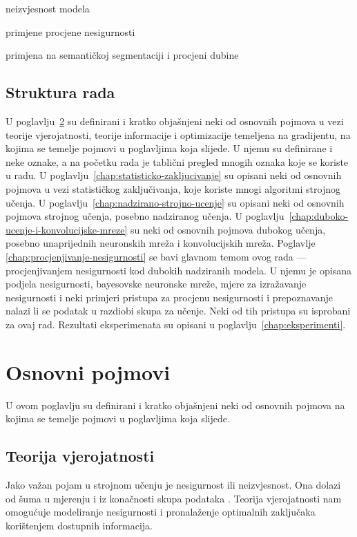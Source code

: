 \documentclass[utf8, diplomski, lmodern]{fer}
\begin{document}
neizvjesnost modela

primjene procjene nesigurnosti

primjena na semantičkoj segmentaciji i procjeni dubine


\section{Struktura rada}

U poglavlju~\ref{chap:osnovni-pojmovi} su definirani i kratko objašnjeni neki od osnovnih pojmova u vezi teorije vjerojatnosti, teorije informacije i optimizacije temeljena na gradijentu, na kojima se temelje pojmovi u poglavljima koja slijede. U njemu su definirane i neke oznake, a na početku rada je tablični pregled mnogih oznaka koje se koriste u radu. 
U poglavlju~\ref{chap:statisticko-zakljucivanje} su opisani neki od osnovnih pojmova u vezi statističkog zaključivanja, koje koriste mnogi algoritmi strojnog učenja.
U poglavlju~\ref{chap:nadzirano-strojno-ucenje} su opisani neki od osnovnih pojmova strojnog učenja, posebno nadziranog učenja.
U poglavlju~\ref{chap:duboko-ucenje-i-konvolucijske-mreze} su neki od osnovnih pojmova dubokog učenja, posebno unaprijednih neuronskih mreža i konvolucijskih mreža.
Poglavlje \ref{chap:procjenjivanje-nesigurnosti} se bavi glavnom temom ovog rada --- procjenjivanjem nesigurnosti kod dubokih nadziranih modela. U njemu je opisana podjela nesigurnosti, bayesovske neuronske mreže, mjere za izražavanje nesigurnosti i neki primjeri pristupa za procjenu nesigurnosti i prepoznavanje nalazi li se podatak u razdiobi skupa za učenje. Neki od tih pristupa \citep{Kendall:2017:WUNBDLCV,Hendrycks:2016:BDMOODE,Liang:2017:PDOODENN} su isprobani za ovaj rad. Rezultati eksperimenata su opisani u poglavlju~\ref{chap:eksperimenti}.


\chapter{Osnovni pojmovi} \label{chap:osnovni-pojmovi}

U ovom poglavlju su definirani i kratko objašnjeni neki od osnovnih pojmova na kojima se temelje pojmovi u poglavljima koja slijede.

\section{Teorija vjerojatnosti}

Jako važan pojam u strojnom učenju je nesigurnost ili neizvjesnost. Ona dolazi od šuma u mjerenju i iz konačnosti skupa podataka \citep{Bishop:2006:PRML}. Teorija vjerojatnosti nam omogućuje modeliranje nesigurnosti i pronalaženje optimalnih zaključaka korištenjem dostupnih informacija.
\end{document}

